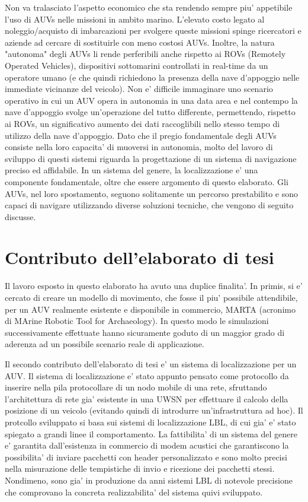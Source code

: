 \documentclass[Lau,binding=0.6cm]{sapthesis}
\begin{document}
Non va tralasciato l'aspetto economico che sta rendendo sempre piu' appetibile l'uso di AUVs nelle missioni in ambito marino. L'elevato costo legato al noleggio/acquisto di imbarcazioni per svolgere queste missioni spinge ricercatori e aziende ad cercare di sostituirle con meno costosi AUVs. Inoltre, la natura "autonoma" degli AUVs li rende perferibili anche rispetto ai ROVs (Remotely Operated Vehicles), dispositivi sottomarini controllati in real-time da un operatore umano (e che quindi richiedono la presenza della nave d'appoggio nelle immediate vicinanze del veicolo). Non e' difficile immaginare uno scenario operativo in cui un AUV opera in autonomia in una data area e nel contempo la nave d'appoggio svolge un'operazione del tutto differente, permettendo, rispetto ai ROVs, un significativo aumento dei dati raccoglibili nello stesso tempo di utilizzo della nave d'appoggio. \newline
Dato che il pregio fondamentale degli AUVs consiste nella loro capacita' di muoversi in autonomia, molto del lavoro di sviluppo di questi sistemi riguarda la progettazione di un sistema di navigazione preciso ed affidabile. In un sistema del genere, la localizzazione e' una componente fondamentale, oltre che essere argomento di questo elaborato.
Gli AUVs, nel loro spostamento, seguono solitamente un percorso prestabilito e sono capaci di navigare utilizzando diverse soluzioni tecniche, che vengono di seguito discusse.


\section{Contributo dell'elaborato di tesi}
Il lavoro esposto in questo elaborato ha avuto una duplice finalita'.
In primis, si e' cercato di creare un modello di movimento, che fosse il piu' possibile attendibile, per un AUV realmente esistente e disponibile in commercio, MARTA (acronimo di MArine Robotic Tool for Archaeology). In questo modo le simulazioni successivamente effettuate hanno sicuramente goduto di un maggior grado di aderenza ad un possibile scenario reale di applicazione.
\par
Il secondo contributo dell'elaborato di tesi e' un sistema di localizzazione per un AUV.
Il sistema di localizzazione e' stato appunto pensato come protocollo da inserire nella pila protocollare di un nodo mobile di una rete, sfruttando l'architettura di rete gia' esistente in una UWSN per effettuare il calcolo della posizione di un veicolo (evitando quindi di introdurre un'infrastruttura ad hoc).
Il protcollo sviluppato si basa sui sistemi di localizzazione LBL, di cui gia' e' stato spiegato a grandi linee il comportamento. La fattibilita' di un sistema del genere e' garantita dall'esistenza in commercio di modem acustici che garantiscono la possibilita' di inviare pacchetti con header personalizzato e sono molto precisi nella misurazione delle tempistiche di invio e ricezione dei pacchetti stessi. Nondimeno, sono gia' in produzione da anni sistemi LBL di notevole precisione \cite{lblsonardyne} che comprovano la concreta realizzabilita' del sistema quivi sviluppato.
\end{document}
